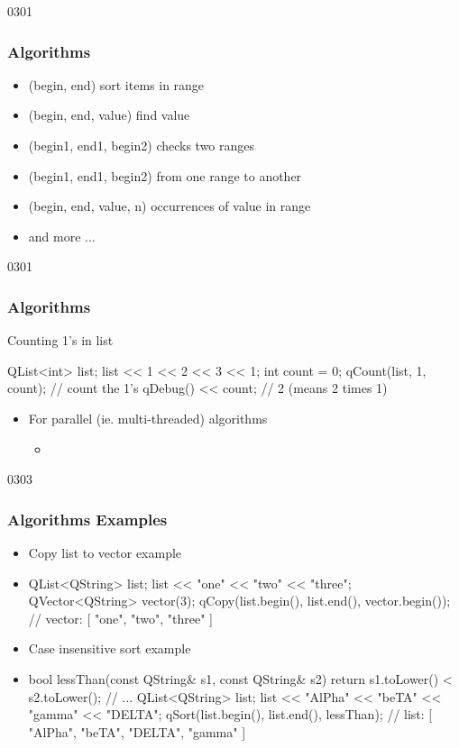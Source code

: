 \begin{slide}[fragile]{0301}\frametitle{Algorithms}
\begin{itemize}
\item {}(begin, end) sort items in range
\item {}(begin, end, value) find value
\item {}(begin1, end1, begin2) checks two ranges
\item {}(begin1, end1, begin2) from one range to another
\item {}(begin, end, value, n) occurrences of value in range
\item and more ...
\end{itemize}
\end{slide}

\begin{slide}[fragile]{0301}\frametitle{Algorithms}
Counting 1's in list          
\begin{cpp}
QList<int> list;
list << 1 << 2 << 3 << 1;
int count = 0;
qCount(list, 1, count); // count the 1's
qDebug() << count;      // 2  (means 2 times 1)
\end{cpp}
\begin{itemize}
  \item For parallel (ie. multi-threaded) algorithms
  \begin{itemize}  
  	\item {}
  \end{itemize}
\end{itemize}    
\end{slide}

\begin{slide}[fragile]{0303}\frametitle{Algorithms Examples}
\begin{itemize}
  \item Copy list to vector example
  \item[] \begin{cpp}
QList<QString> list;
list << "one" << "two" << "three";
QVector<QString> vector(3);
qCopy(list.begin(), list.end(), vector.begin());
// vector: [ "one", "two", "three" ]
  \end{cpp}      
  \item Case insensitive sort example
  \item[] \begin{cpp}
bool lessThan(const QString& s1, const QString& s2) {
    return s1.toLower() < s2.toLower();
}
// ...
QList<QString> list;
list << "AlPha" << "beTA" << "gamma" << "DELTA";
qSort(list.begin(), list.end(), lessThan);
// list: [ "AlPha", "beTA", "DELTA", "gamma" ]
\end{cpp}
  
\end{itemize}
\end{slide}

